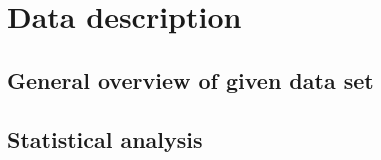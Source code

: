 \section{Data description}
\label{sec:data-description}
\subsection{General overview of given data set}
\subsection{Statistical analysis}